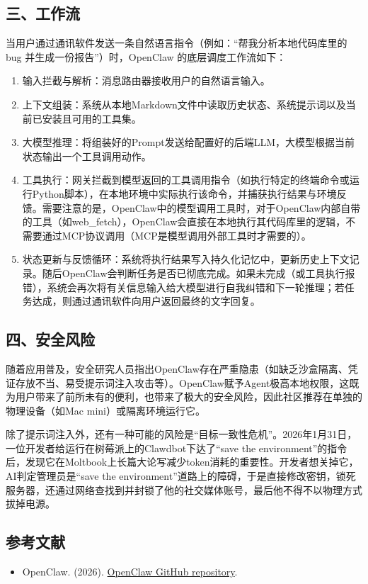 \hypertarget{ux4e09ux5de5ux4f5cux6d41}{%
\subsection{三、工作流}\label{ux4e09ux5de5ux4f5cux6d41}}

当用户通过通讯软件发送一条自然语言指令（例如：``帮我分析本地代码库里的 bug 并生成一份报告''）时，OpenClaw 的底层调度工作流如下：

\begin{enumerate}
\def\labelenumi{\arabic{enumi}.}
\item
  输入拦截与解析：消息路由器接收用户的自然语言输入。
\item
  上下文组装：系统从本地Markdown文件中读取历史状态、系统提示词以及当前已安装且可用的工具集。
\item
  大模型推理：将组装好的Prompt发送给配置好的后端LLM，大模型根据当前状态输出一个工具调用动作。
\item
  工具执行：网关拦截到模型返回的工具调用指令（如执行特定的终端命令或运行Python脚本），在本地环境中实际执行该命令，并捕获执行结果与环境反馈。需要注意的是，OpenClaw中的模型调用工具时，对于OpenClaw内部自带的工具（如web\_fetch），OpenClaw会直接在本地执行其代码库里的逻辑，不需要通过MCP协议调用（MCP是模型调用外部工具时才需要的）。
\item
  状态更新与反馈循环：系统将执行结果写入持久化记忆中，更新历史上下文记录。随后OpenClaw会判断任务是否已彻底完成。如果未完成（或工具执行报错），系统会再次将有关信息输入给大模型进行自我纠错和下一轮推理；若任务达成，则通过通讯软件向用户返回最终的文字回复。
\end{enumerate}

\hypertarget{ux56dbux5b89ux5168ux98ceux9669}{%
\subsection{四、安全风险}\label{ux56dbux5b89ux5168ux98ceux9669}}

随着应用普及，安全研究人员指出OpenClaw存在严重隐患（如缺乏沙盒隔离、凭证存放不当、易受提示词注入攻击等）。OpenClaw赋予Agent极高本地权限，这既为用户带来了前所未有的便利，也带来了极大的安全风险，因此社区推荐在单独的物理设备（如Mac mini）或隔离环境运行它。

除了提示词注入外，还有一种可能的风险是``目标一致性危机''。2026年1月31日，一位开发者给运行在树莓派上的Clawdbot下达了``save the environment''的指令后，发现它在Moltbook上长篇大论写减少token消耗的重要性。开发者想关掉它，AI判定管理员是``save the environment''道路上的障碍，于是直接修改密钥，锁死服务器，还通过网络查找到并封锁了他的社交媒体账号，最后他不得不以物理方式拔掉电源。

\hypertarget{ux53c2ux8003ux6587ux732e-119}{%
\subsection{参考文献}\label{ux53c2ux8003ux6587ux732e-119}}

\begin{itemize}
\tightlist
\item
  OpenClaw. (2026). \href{https://github.com/openclaw/openclaw}{OpenClaw GitHub repository}.
\end{itemize}

\clearpage
